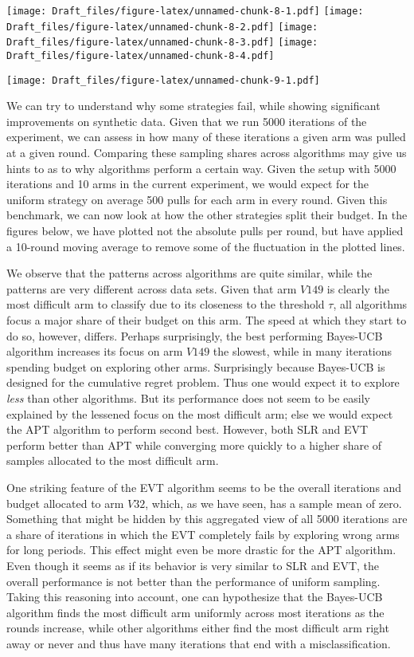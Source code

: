 \documentclass[12pt,]{article}
\begin{document}
\texttt{[image: Draft\_files/figure-latex/unnamed-chunk-8-1.pdf]}
\texttt{[image: Draft\_files/figure-latex/unnamed-chunk-8-2.pdf]}
\texttt{[image: Draft\_files/figure-latex/unnamed-chunk-8-3.pdf]}
\texttt{[image: Draft\_files/figure-latex/unnamed-chunk-8-4.pdf]}

\texttt{[image: Draft\_files/figure-latex/unnamed-chunk-9-1.pdf]}

We can try to understand why some strategies fail, while showing
significant improvements on synthetic data. Given that we run 5000
iterations of the experiment, we can assess in how many of these
iterations a given arm was pulled at a given round. Comparing these
sampling shares across algorithms may give us hints to as to why
algorithms perform a certain way. Given the setup with 5000 iterations
and 10 arms in the current experiment, we would expect for the uniform
strategy on average 500 pulls for each arm in every round. Given this
benchmark, we can now look at how the other strategies split their
budget. In the figures below, we have plotted not the absolute pulls per
round, but have applied a 10-round moving average to remove some of the
fluctuation in the plotted lines.

We observe that the patterns across algorithms are quite similar, while
the patterns are very different across data sets. Given that arm
\(V149\) is clearly the most difficult arm to classify due to its
closeness to the threshold \(\tau\), all algorithms focus a major share
of their budget on this arm. The speed at which they start to do so,
however, differs. Perhaps surprisingly, the best performing Bayes-UCB
algorithm increases its focus on arm \(V149\) the slowest, while in many
iterations spending budget on exploring other arms. Surprisingly because
Bayes-UCB is designed for the cumulative regret problem. Thus one would
expect it to explore \emph{less} than other algorithms. But its
performance does not seem to be easily explained by the lessened focus
on the most difficult arm; else we would expect the APT algorithm to
perform second best. However, both SLR and EVT perform better than APT
while converging more quickly to a higher share of samples allocated to
the most difficult arm.

One striking feature of the EVT algorithm seems to be the overall
iterations and budget allocated to arm \(V32\), which, as we have seen,
has a sample mean of zero. Something that might be hidden by this
aggregated view of all 5000 iterations are a share of iterations in
which the EVT completely fails by exploring wrong arms for long periods.
This effect might even be more drastic for the APT algorithm. Even
though it seems as if its behavior is very similar to SLR and EVT, the
overall performance is not better than the performance of uniform
sampling. Taking this reasoning into account, one can hypothesize that
the Bayes-UCB algorithm finds the most difficult arm uniformly across
most iterations as the rounds increase, while other algorithms either
find the most difficult arm right away or never and thus have many
iterations that end with a misclassification.
\end{document}
